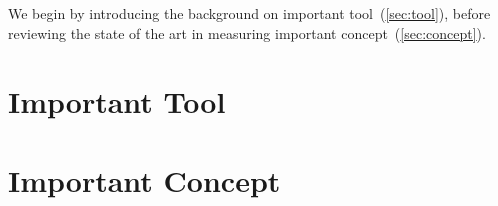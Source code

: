 We begin by introducing the background on important tool~(\autoref{sec:tool}), before reviewing the state of the art in measuring important concept~(\autoref{sec:concept}).

\section{Important Tool}
\label{sec:tool}

\lipsum[2-3]

\section{Important Concept}
\label{sec:concept}

\lipsum[2-3]


